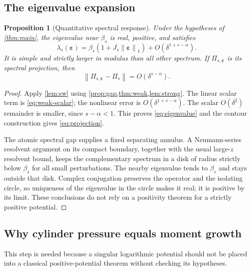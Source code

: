 \documentclass[11pt,a4paper]{article}
\numberwithin{equation}{section}
\newtheorem{proposition}[proposition]{Proposition}
\theoremstyle{definition}
\theoremstyle{remark}
\newcommand{\norm}[1]{\left\lVert#1\right\rVert}
\newcommand{\eps}{\boldsymbol\varepsilon}
\newcommand{\Proj}{\Pi}
\begin{document}
\subsection{The eigenvalue expansion}
\begin{proposition}[Quantitative spectral response]
\label{prop:eigenvalue}
Under the hypotheses of \cref{thm:main}, the eigenvalue near $\beta_s$
is real, positive, and satisfies
\begin{equation}
 \lambda_s(\eps)=\beta_s\left(1+J_s\norm\eps_1\right)
                       +O(\delta^{1+s-\alpha}).
 \label{eq:eigenvalue}
\end{equation}
It is simple and strictly larger in modulus than all other spectrum.
If $\Proj_{s,\eps}$ is its spectral projection, then
\begin{equation}
 \norm{\Proj_{s,\eps}-\Proj_s}=O(\delta^{s-\alpha}).
 \label{eq:projection}
\end{equation}
\end{proposition}
\begin{proof}
Apply \cref{lem:sw} using \cref{prop:gap,thm:weak,lem:strong}. The
linear scalar term is \cref{eq:weak-scalar}; the nonlinear error is
$O(\delta^{1+s-\alpha})$. The scalar $O(\delta^2)$ remainder is smaller,
since $s-\alpha<1$. This proves \cref{eq:eigenvalue} and the contour
construction gives \cref{eq:projection}.

The atomic spectral gap supplies a fixed separating annulus. A
Neumann-series resolvent argument on its compact boundary, together
with the usual large-$z$ resolvent bound, keeps the complementary
spectrum in a disk of radius strictly below $\beta_s$ for all small
perturbations. The nearby eigenvalue tends to $\beta_s$ and stays
outside that disk. Complex conjugation preserves the operator and the
isolating circle, so uniqueness of the eigenvalue in the circle makes
it real; it is positive by its limit. These conclusions do not rely
on a positivity theorem for a strictly positive potential.
\end{proof}

\subsection{Why cylinder pressure equals moment growth}
This step is needed because a singular logarithmic potential should
not be placed into a classical positive-potential theorem without
checking its hypotheses.
\end{document}
